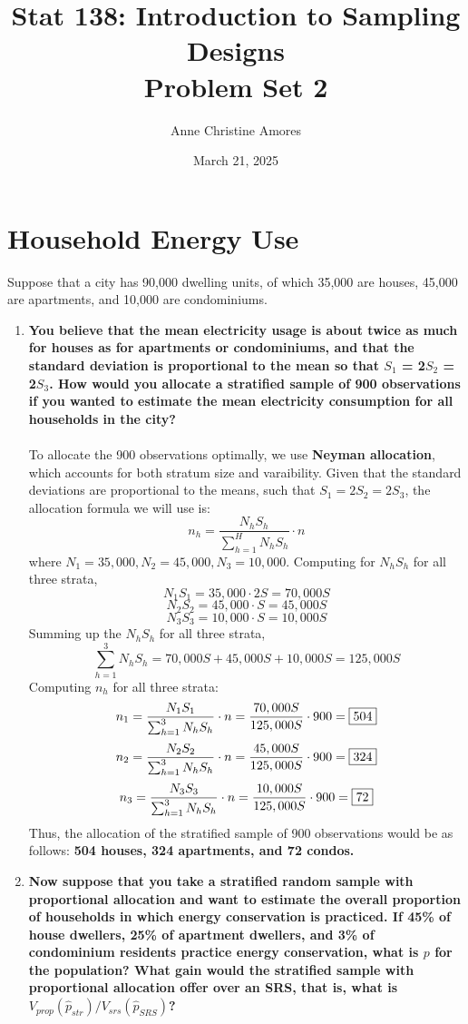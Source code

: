 \documentclass[]{article}
\author{}
\date{\vspace{-2.5em}}
\title{Stat 138: Introduction to Sampling Designs \\ Problem Set 2}
\author{Anne Christine Amores}
\date{March 21, 2025}
\begin{document}
\maketitle

\section{Household Energy Use}

Suppose that a city has 90,000 dwelling units, of which 35,000 are houses, 45,000 are apartments, and 10,000 are condominiums. 

\begin{enumerate}[label=(\alph*)]

\item \textbf{You believe that the mean electricity usage is about twice as much for houses as for apartments or condominiums, and that the standard deviation is proportional to the mean so that $S_1$ = 2$S_2$ = 2$S_3$. How would you allocate a stratified sample of 900 observations if you wanted to estimate the mean electricity consumption for all households in the city?} \\
\\
To allocate the 900 observations optimally, we use \textbf{Neyman allocation}, which accounts for both stratum size and varaibility. Given that the standard deviations are proportional to the means, such that $S_1 = 2S_2 = 2S_3$, the allocation formula we will use is:
\[
n_h = \frac{N_hS_h}{\sum_{h=1}^{H}{N_hS_h}}\cdot n
\]
where $N_1 = 35,000, N_2 = 45,000, N_3 = 10,000.$
Computing for $N_hS_h$ for all three strata,
\[
N_1S_1 = 35,000 \cdot2S = 70,000S
\]
\[
N_2S_2 = 45,000 \cdot S = 45,000S
\]
\[
N_3S_3 = 10,000 \cdot S = 10,000S
\]
Summing up the $N_hS_h$ for all three strata,
\[
\sum_{h=1}^{3}{N_hS_h} = 70,000S + 45,000S + 10,000S = 125,000S
\]
Computing $n_h$ for all three strata:
\[
n_1 = \frac{N_1S_1}{\sum_{h=1}^{3}{N_hS_h}} \cdot n = \frac{70,000S}{125,000S} \cdot 900 = \fbox{504} 
\]
\[
n_2 = \frac{N_2S_2}{\sum_{h=1}^{3}{N_hS_h}} \cdot n = \frac{45,000S}{125,000S} \cdot 900 = \fbox{324} 
\]
\[
n_3 = \frac{N_3S_3}{\sum_{h=1}^{3}{N_hS_h}} \cdot n = \frac{10,000S}{125,000S} \cdot 900 = \fbox{72} 
\]
Thus, the allocation of the stratified sample of 900 observations would be as follows: \textbf{504 houses, 324 apartments, and 72 condos.} 
\item \textbf{Now suppose that you take a stratified random sample with proportional allocation and want to estimate the overall proportion of households in which energy conservation is practiced. If 45\% of house dwellers, 25\% of apartment dwellers, and 3\% of condominium residents practice energy conservation, what is $p$ for the population? What gain would the stratified sample with proportional allocation offer over an SRS, that is, what is $V_{prop}(\hat p_{str})/V_{srs}(\hat p_{SRS})$?}  \\

\end{enumerate}
\end{document}

